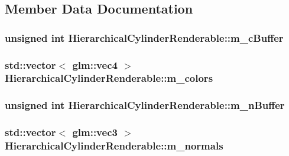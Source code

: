 \subsection{Member Data Documentation}
\hypertarget{classHierarchicalCylinderRenderable_a235710905d690d2ac3ee338ff486cf00}{
\subsubsection[{m\+\_\+c\+Buffer}]{\setlength{\rightskip}{0pt plus 5cm}unsigned int Hierarchical\+Cylinder\+Renderable\+::m\+\_\+c\+Buffer\hspace{0.3cm}{\ttfamily [private]}}}\label{classHierarchicalCylinderRenderable_a235710905d690d2ac3ee338ff486cf00}
\hypertarget{classHierarchicalCylinderRenderable_aba8133be058d160bf53a66f205188e0a}{
\subsubsection[{m\+\_\+colors}]{\setlength{\rightskip}{0pt plus 5cm}std\+::vector$<$ glm\+::vec4 $>$ Hierarchical\+Cylinder\+Renderable\+::m\+\_\+colors\hspace{0.3cm}{\ttfamily [private]}}}\label{classHierarchicalCylinderRenderable_aba8133be058d160bf53a66f205188e0a}
\hypertarget{classHierarchicalCylinderRenderable_aeede6a6e7c005db3949e90036855b0c5}{
\subsubsection[{m\+\_\+n\+Buffer}]{\setlength{\rightskip}{0pt plus 5cm}unsigned int Hierarchical\+Cylinder\+Renderable\+::m\+\_\+n\+Buffer\hspace{0.3cm}{\ttfamily [private]}}}\label{classHierarchicalCylinderRenderable_aeede6a6e7c005db3949e90036855b0c5}
\hypertarget{classHierarchicalCylinderRenderable_af38a98b2fe2ca4b179d93b02dbf759fd}{
\subsubsection[{m\+\_\+normals}]{\setlength{\rightskip}{0pt plus 5cm}std\+::vector$<$ glm\+::vec3 $>$ Hierarchical\+Cylinder\+Renderable\+::m\+\_\+normals\hspace{0.3cm}{\ttfamily [private]}}}\label{classHierarchicalCylinderRenderable_af38a98b2fe2ca4b179d93b02dbf759fd}
